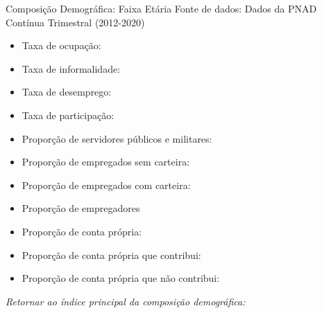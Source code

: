 \begin{frame}[label=_composicao_demografica_faixa_etaria]{Composição Demográfica: Faixa Etária}
{\footnotesize Fonte de dados: Dados da PNAD Contínua Trimestral (2012-2020)}
\begin{itemize}
\item{Taxa de ocupação: \hyperlink{_composicao_demografica_faixa_etaria_taxa_de_ocupacao}{}}
\item{Taxa de informalidade: \hyperlink{_composicao_demografica_faixa_etaria_taxa_de_informalidade}{}}
\item{Taxa de desemprego: \hyperlink{_composicao_demografica_faixa_etaria_taxa_de_desemprego}{}}
\item{Taxa de participação: \hyperlink{_composicao_demografica_faixa_etaria_taxa_de_participacao}{}}
\item{Proporção de servidores públicos e militares: \hyperlink{_composicao_demografica_faixa_etaria_prop_militar}{}}
\item{Proporção de empregados sem carteira: \hyperlink{_composicao_demografica_faixa_etaria_prop_empregadoSC}{}}
\item{Proporção de empregados com carteira: \hyperlink{_composicao_demografica_faixa_etaria_prop_empregadoCC}{}}
\item{Proporção de empregadores \hyperlink{_composicao_demografica_faixa_etaria_prop_empregador}{}}
\item{Proporção de conta própria: \hyperlink{_composicao_demografica_faixa_etaria_prop_cpropria}{}}
\item{Proporção de conta própria que contribui: \hyperlink{_composicao_demografica_faixa_etaria_prop_cpropriaC}{}}
\item{Proporção de conta própria que não contribui: \hyperlink{_composicao_demografica_faixa_etaria_prop_cpropriaNc}{}}
\end{itemize}

\begin{small}
\textit{Retornar ao índice principal da composição demográfica: \hyperlink{_composicao_demografica}{} }
\end{small}

\end{frame}

